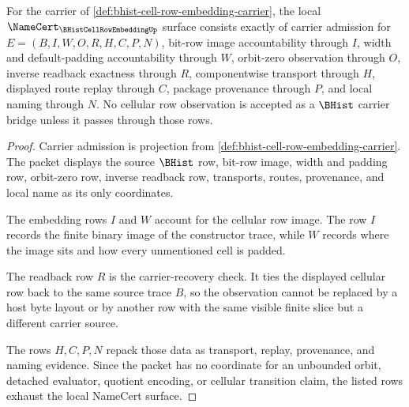 \begin{theorem}
\label{thm:bhist-cell-row-embedding-namecert-obligations}
For the carrier of \autoref{def:bhist-cell-row-embedding-carrier}, the local $\NameCert_{\BHistCellRowEmbeddingUp}$ surface consists exactly of carrier admission for $E=(B,I,W,O,R,H,C,P,N)$, bit-row image accountability through $I$, width and default-padding accountability through $W$, orbit-zero observation through $O$, inverse readback exactness through $R$, componentwise transport through $H$, displayed route replay through $C$, package provenance through $P$, and local naming through $N$. No cellular row observation is accepted as a $\BHist$ carrier bridge unless it passes through those rows.
\end{theorem}
\begin{proof}
Carrier admission is projection from \autoref{def:bhist-cell-row-embedding-carrier}. The packet displays the source $\BHist$ row, bit-row image, width and padding row, orbit-zero row, inverse readback row, transports, routes, provenance, and local name as its only coordinates.

The embedding rows $I$ and $W$ account for the cellular row image. The row $I$ records the finite binary image of the constructor trace, while $W$ records where the image sits and how every unmentioned cell is padded.

The readback row $R$ is the carrier-recovery check. It ties the displayed cellular row back to the same source trace $B$, so the observation cannot be replaced by a host byte layout or by another row with the same visible finite slice but a different carrier source.

The rows $H,C,P,N$ repack those data as transport, replay, provenance, and naming evidence. Since the packet has no coordinate for an unbounded orbit, detached evaluator, quotient encoding, or cellular transition claim, the listed rows exhaust the local NameCert surface.
\end{proof}

